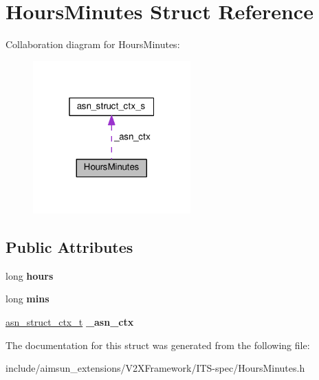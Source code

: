 \hypertarget{structHoursMinutes}{}\section{Hours\+Minutes Struct Reference}
\label{structHoursMinutes}


Collaboration diagram for Hours\+Minutes\+:\nopagebreak
\begin{figure}[H]
\begin{center}
\leavevmode
\includegraphics[width=172pt]{structHoursMinutes__coll__graph}
\end{center}
\end{figure}
\subsection*{Public Attributes}
\begin{DoxyCompactItemize}
\item 
long {\bfseries hours}\hypertarget{structHoursMinutes_af814aa5e02385501f0b0096ac3478dc1}{}\label{structHoursMinutes_af814aa5e02385501f0b0096ac3478dc1}

\item 
long {\bfseries mins}\hypertarget{structHoursMinutes_ad2b213ee3f310bb396035051ac7f1e41}{}\label{structHoursMinutes_ad2b213ee3f310bb396035051ac7f1e41}

\item 
\hyperlink{structasn__struct__ctx__s}{asn\+\_\+struct\+\_\+ctx\+\_\+t} {\bfseries \+\_\+asn\+\_\+ctx}\hypertarget{structHoursMinutes_ad359b78107adbe210114f581ed89dd9b}{}\label{structHoursMinutes_ad359b78107adbe210114f581ed89dd9b}

\end{DoxyCompactItemize}


The documentation for this struct was generated from the following file\+:\begin{DoxyCompactItemize}
\item 
include/aimsun\+\_\+extensions/\+V2\+X\+Framework/\+I\+T\+S-\/spec/Hours\+Minutes.\+h\end{DoxyCompactItemize}
